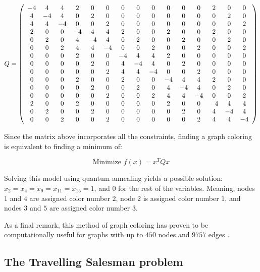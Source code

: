 $$
Q = 
\left(
\begin{array}{*{15}c}
	-4 & 4 & 4 & 2 & 0 & 0 & 0 & 0 & 0 & 0 & 0 & 0 & 2 & 0 & 0 \\
	4 & -4 & 4 & 0 & 2 & 0 & 0 & 0 & 0 & 0 & 0 & 0 & 0 & 2 & 0 \\
	4 & 4 & -4 & 0 & 0 & 2 & 0 & 0 & 0 & 0 & 0 & 0 & 0 & 0 & 2 \\
	2 & 0 & 0 & -4 & 4 & 4 & 2 & 0 & 0 & 2 & 0 & 0 & 2 & 0 & 0 \\
	0 & 2 & 0 & 4 & -4 & 4 & 0 & 2 & 0 & 0 & 2 & 0 & 0 & 2 & 0 \\
	0 & 0 & 2 & 4 & 4 & -4 & 0 & 0 & 2 & 0 & 0 & 2 & 0 & 0 & 2 \\
	0 & 0 & 0 & 2 & 0 & 0 & -4 & 4 & 4 & 2 & 0 & 0 & 0 & 0 & 0 \\
	0 & 0 & 0 & 0 & 2 & 0 & 4 & -4 & 4 & 0 & 2 & 0 & 0 & 0 & 0 \\
	0 & 0 & 0 & 0 & 0 & 2 & 4 & 4 & -4 & 0 & 0 & 2 & 0 & 0 & 0 \\
	0 & 0 & 0 & 2 & 0 & 0 & 2 & 0 & 0 & -4 & 4 & 4 & 2 & 0 & 0 \\
	0 & 0 & 0 & 0 & 2 & 0 & 0 & 2 & 0 & 4 & -4 & 4 & 0 & 2 & 0 \\
	0 & 0 & 0 & 0 & 0 & 2 & 0 & 0 & 2 & 4 & 4 & -4 & 0 & 0 & 2 \\
	2 & 0 & 0 & 2 & 0 & 0 & 0 & 0 & 0 & 2 & 0 & 0 & -4 & 4 & 4 \\
	0 & 2 & 0 & 0 & 2 & 0 & 0 & 0 & 0 & 0 & 2 & 0 & 4 & -4 & 4 \\
	0 & 0 & 2 & 0 & 0 & 2 & 0 & 0 & 0 & 0 & 0 & 2 & 4 & 4 & -4 
\end{array}
\right)
$$

Since the matrix above incorporates all the constraints, finding a graph coloring is equivalent to finding a minimum of:

$$ \text{Minimize } f(x) = x^T Q x $$

Solving this model using quantum annealing yields a possible solution: $x_2 = x_4 = x_9 = x_{11} = x_{15} = 1$, and $0$ for the rest of the variables. Meaning, nodes $1$ and $4$ are assigned color number $2$, node $2$ is assigned color number $1$, and nodes $3$ and $5$ are assigned color number $3$.

As a final remark, this method of graph coloring has proven to be computationally useful for graphs with up to $450$ nodes and $9757$ edges \cite{Kochenberger2005}.


\subsection{The Travelling Salesman problem}
\label{sec:tsp-qubo}


